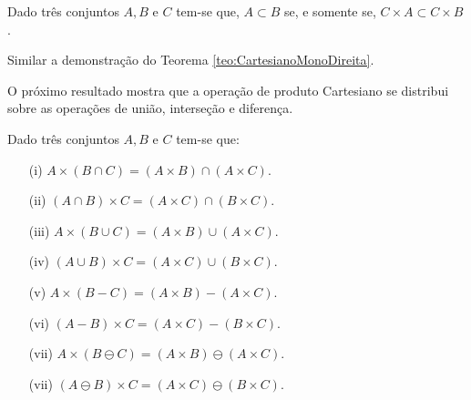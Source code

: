 \begin{teorema}
	Dado três conjuntos $A, B$ e $C$ tem-se que, $A \subset B$ se, e somente se, $C \times A \subset C \times B$.
\end{teorema}

\begin{prova}
	Similar a demonstração do Teorema \ref{teo:CartesianoMonoDireita}.
\end{prova}

O próximo resultado mostra que a operação de produto Cartesiano se distribui sobre as operações de união, interseção e diferença.

\begin{teorema}\label{teo:DistributividadeCartesiano}
	Dado três conjuntos $A, B$ e $C$ tem-se que:
	\begin{itemize}
		\item[(i)] $A \times (B \cap C) = (A \times B) \cap (A \times C)$.
		\item[(ii)] $(A \cap B) \times C = (A \times C) \cap (B \times C)$.
		\item[(iii)] $A \times (B \cup C) = (A \times B) \cup (A \times C)$.
		\item[(iv)] $(A \cup B) \times C = (A \times C) \cup (B \times C)$.
		\item[(v)] $A \times (B - C) = (A \times B) - (A \times C)$.
		\item[(vi)] $(A - B) \times C = (A \times C) - (B \times C)$.
		\item[(vii)] $A \times (B \ominus C) = (A \times B) \ominus (A \times C)$.
		\item[(vii)] $(A \ominus B) \times C = (A \times C) \ominus (B \times C)$.
	\end{itemize}
\end{teorema}

